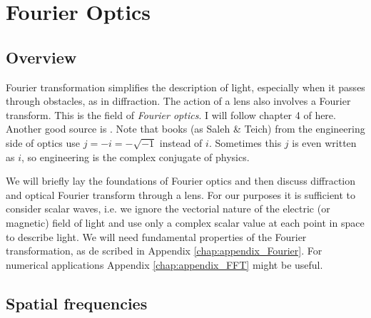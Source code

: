 \renewcommand{\lastmod}{November 8, 2023}
\renewcommand{\chapterauthors}{Markus Lippitz}

\chapter{Fourier Optics}





\section{Overview}
Fourier transformation simplifies the description of light, especially when it passes through obstacles, as in diffraction. The action of a lens also involves a Fourier transform. This is the field of \emph{Fourier optics}. I will follow chapter 4 of \cite{SalehTeich1991} here. Another good source is \cite{Goodman2005}. Note that books (as Saleh \& Teich) from the engineering  side of optics use $j = - i = - \sqrt{-1}$ instead of $i$. Sometimes this $j$ is even written as $i$, so engineering is the complex conjugate of physics.


We will briefly lay the foundations of Fourier optics and then discuss diffraction and optical Fourier transform through a lens. For our purposes it is sufficient to consider scalar waves, i.e. we ignore the vectorial nature of the electric (or magnetic) field of light and use only a complex scalar value at each point in space to describe light. We will need fundamental properties of the Fourier transformation, as de scribed in Appendix \ref{chap:appendix_Fourier}. For numerical applications Appendix \ref{chap:appendix_FFT}
might be useful.

\section{Spatial frequencies}

